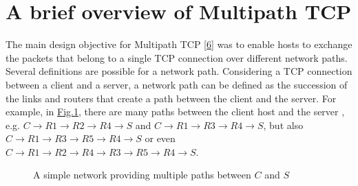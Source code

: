 \documentclass[letterpaper,10pt,english]{sphinxmanual}
\begin{document}
\section{A brief overview of Multipath TCP}
\label{\detokenize{mptcp:a-brief-overview-of-multipath-tcp}}\label{\detokenize{mptcp:mptcp-overview}}
\sphinxAtStartPar
The main design objective for Multipath TCP {[}\hyperlink{cite.biblio:id6658}{6}{]} was to enable hosts to exchange the packets that belong to a single TCP connection over different network paths. Several definitions are possible for a network path. Considering a TCP connection between a client and a server, a network path can be defined as the succession of the links and routers that create a path between the client and the server. For example, in \hyperref[\detokenize{mptcp:fig-simple-network}]{Fig.\@ \ref{\detokenize{mptcp:fig-simple-network}}}, there are many paths between the client host  and the server , e.g. \(C \rightarrow R1 \rightarrow R2 \rightarrow R4 \rightarrow S\) and \(C \rightarrow R1 \rightarrow R3 \rightarrow R4 \rightarrow S\), but also \(C \rightarrow R1 \rightarrow R3 \rightarrow R5 \rightarrow R4 \rightarrow S\) or even \(C \rightarrow R1 \rightarrow R2 \rightarrow R4 \rightarrow R3 \rightarrow R5 \rightarrow R4 \rightarrow S\).
\begin{figure}[htbp]\centering\capstart{}\caption{A simple network providing multiple paths between \(C\) and \(S\)}\label{\detokenize{mptcp:id52}}\label{\detokenize{mptcp:fig-simple-network}}\end{figure}
\sphinxAtStartPar
\end{document}
